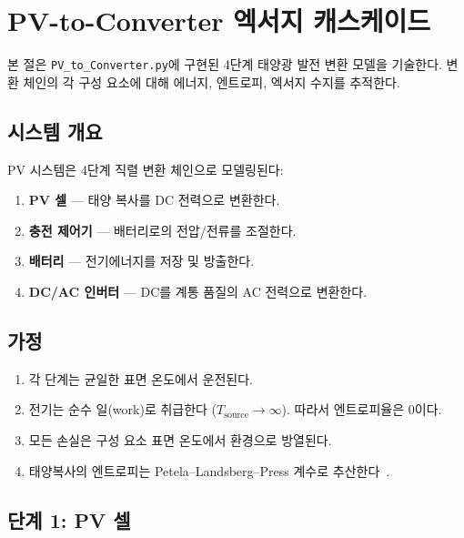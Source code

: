 \section{PV-to-Converter 엑서지 캐스케이드}
\label{sec:pv-converter}

본 절은 \texttt{PV\_to\_Converter.py}에 구현된 4단계 태양광 발전 변환 모델을 기술한다. 변환 체인의 각 구성 요소에 대해 에너지, 엔트로피, 엑서지 수지를 추적한다.

\subsection{시스템 개요}

PV 시스템은 4단계 직렬 변환 체인으로 모델링된다:
\begin{enumerate}
  \item \textbf{PV 셀} — 태양 복사를 DC 전력으로 변환한다.
  \item \textbf{충전 제어기} — 배터리로의 전압/전류를 조절한다.
  \item \textbf{배터리} — 전기에너지를 저장 및 방출한다.
  \item \textbf{DC/AC 인버터} — DC를 계통 품질의 AC 전력으로 변환한다.
\end{enumerate}

\subsection{가정}
\label{sec:pv-assumptions}

\begin{enumerate}
  \item 각 단계는 균일한 표면 온도에서 운전된다.
  \item 전기는 순수 일(work)로 취급한다 ($T_\text{source} \to \infty$). 따라서 엔트로피율은 0이다.
  \item 모든 손실은 구성 요소 표면 온도에서 환경으로 방열된다.
  \item 태양복사의 엔트로피는 Petela--Landsberg--Press 계수로 추산한다~\cite{petela1964}.
\end{enumerate}

\subsection{단계 1: PV 셀}
\label{sec:pv-stage1}

